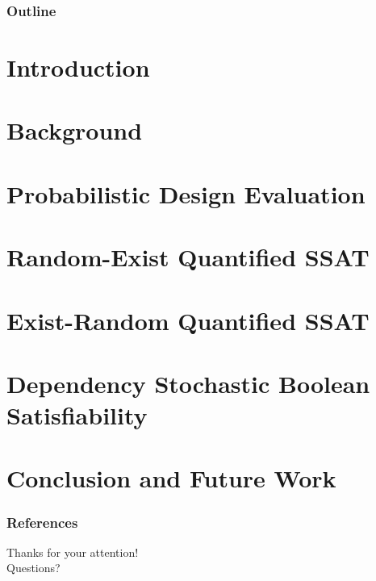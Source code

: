


\frame{\titlepage}

\begin{frame}
    \frametitle{Outline}
    \tableofcontents[hideallsubsections]
\end{frame}

\section{Introduction}

\section{Background}

\section{Probabilistic Design Evaluation}

\section{Random-Exist Quantified SSAT}

\section{Exist-Random Quantified SSAT}

\section{Dependency Stochastic Boolean Satisfiability}

\section{Conclusion and Future Work}


\begin{frame}[allowframebreaks]
    \frametitle{References}
    
    
\end{frame}

\begin{frame}
    \centering\Large
    Thanks for your attention!\\
    Questions?
\end{frame}

